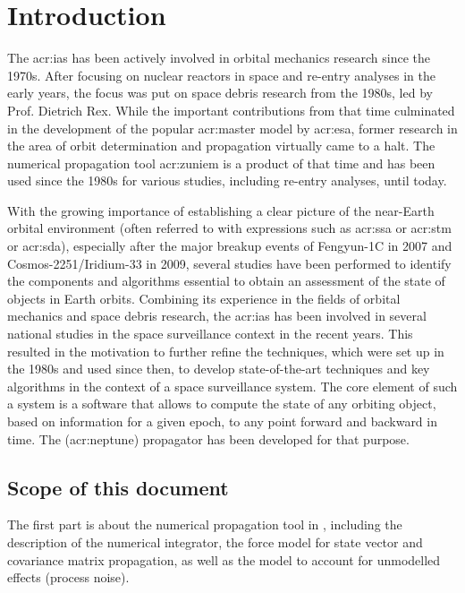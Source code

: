 \chapter{Introduction}
\label{cha:intro}

The \gls{acr:ias} has been actively involved in orbital mechanics research since the \num{1970}s. After focusing on nuclear reactors in space and re-entry analyses in the early years, the focus was put on space debris research from the \num{1980}s, led by Prof. Dietrich Rex. While the important contributions from that time
culminated in the development of the popular \gls{acr:master} model by \acrshort{acr:esa}, former research in the area of orbit determination and propagation
virtually came to a halt. The numerical propagation tool \gls{acr:zuniem} is a product of that time and has been used since the \num{1980}s for various studies,
including re-entry analyses, until today.

With the growing importance of establishing a clear picture of the near-Earth orbital environment (often referred to with expressions such as \gls{acr:ssa} or \gls{acr:stm} or \gls{acr:sda}), especially after the major breakup events of Fengyun-1C in \num{2007} and Cosmos-2251/Iridium-33 in
\num{2009}, several studies have been performed to identify the components and algorithms essential to obtain an assessment of the state of objects in Earth orbits. Combining its experience in the fields of orbital mechanics and space debris research, the \gls{acr:ias} has been involved in several national studies in the space surveillance context in the recent years. This resulted in the motivation to further refine the techniques, which were set up in the \num{1980}s and used
since then, to develop state-of-the-art techniques and key algorithms in the context of a space surveillance system. The core element of such a system is a software that allows to compute the state of any orbiting object, based on information for a given epoch, to any point forward and backward in time. The \neptune (\acrlong{acr:neptune}) propagator has been developed for that purpose.

\section{Scope of this document}

The first part is about the numerical propagation tool \neptune in , including the description of the numerical integrator, the force model for state vector and covariance matrix propagation, as well as the model to account for unmodelled effects (process noise).

